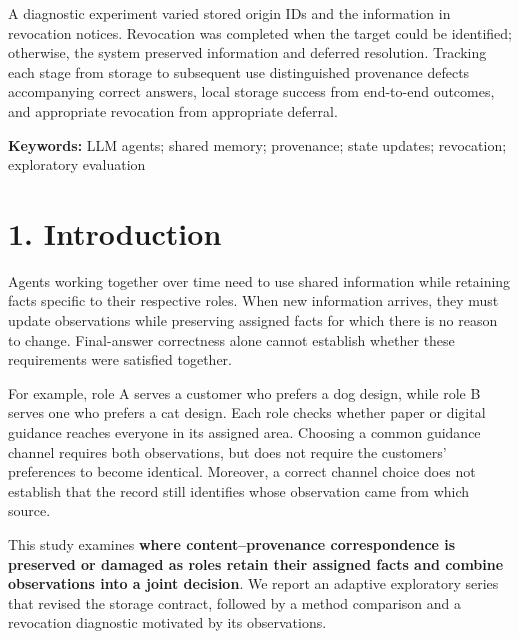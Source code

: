 \documentclass[10pt,a4paper]{article}
\begin{document}
A diagnostic experiment varied stored origin IDs and the information in revocation notices. Revocation was completed when the target could be identified; otherwise, the system preserved information and deferred resolution. Tracking each stage from storage to subsequent use distinguished provenance defects accompanying correct answers, local storage success from end-to-end outcomes, and appropriate revocation from appropriate deferral.

\textbf{Keywords:} LLM agents; shared memory; provenance; state updates; revocation; exploratory evaluation

\clearpage

\section{1. Introduction}\label{paper-01-introduction}

Agents working together over time need to use shared information while retaining facts specific to their respective roles. When new information arrives, they must update observations while preserving assigned facts for which there is no reason to change. Final-answer correctness alone cannot establish whether these requirements were satisfied together.

For example, role A serves a customer who prefers a dog design, while role B serves one who prefers a cat design. Each role checks whether paper or digital guidance reaches everyone in its assigned area. Choosing a common guidance channel requires both observations, but does not require the customers' preferences to become identical. Moreover, a correct channel choice does not establish that the record still identifies whose observation came from which source.

This study examines \textbf{where content--provenance correspondence is preserved or damaged as roles retain their assigned facts and combine observations into a joint decision}. We report an adaptive exploratory series that revised the storage contract, followed by a method comparison and a revocation diagnostic motivated by its observations.
\end{document}
